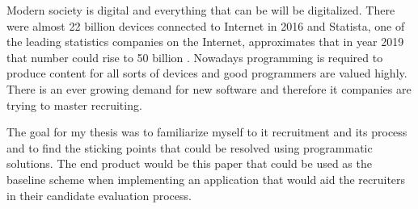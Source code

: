 \documentclass[11pt,a4paper,oneside,article]{memoir}
\begin{document}

Modern society is digital and everything that can be will be digitalized. There were almost 22 billion devices connected to Internet in 2016 and Statista, one of the leading statistics companies on the Internet, approximates that in year 2019 that number could rise to 50 billion \cite{statista:numberof}. Nowadays programming is required to produce content for all sorts of devices and good programmers are valued highly. There is an ever growing demand for new software and therefore \gls{it} companies are trying to master recruiting.



The goal for my thesis was to familiarize myself to \gls{it} recruitment and its process and to find the sticking points that could be resolved using programmatic solutions. The end product would be this paper that could be used as the baseline scheme when implementing an application that would aid the recruiters in their candidate evaluation process.

\end{document}
